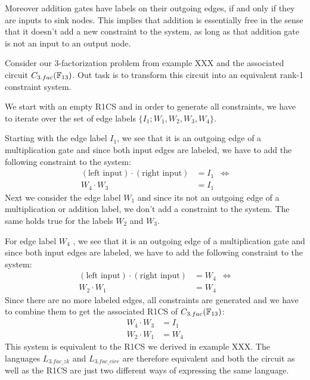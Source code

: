 Moreover addition gates have labels on their outgoing edges, if and only if they are inputs to sink nodes. This implies that addition is essentially free in the sense that it doesn't add a new constraint to the system, as long as that addition gate is not an input to an output node. 
\begin{example}[$3$-factorization] Consider our $3$-factorization problem from example XXX and the associated circuit $C_{3.fac}(\mathbb{F}_{13})$. Out task is to transform this circuit into an equivalent rank-1 constraint system.
\begin{center}
\end{center}
We start with an empty R1CS and in order to generate all constraints, we have to iterate over the set of edge labels $\{I_1;W_1,W_2,W_3,W_4\}$. 

Starting with the edge label $I_1$, we see that it is an outgoing edge of a multiplication gate and since both input edges are labeled, we  have to add the following constraint to the system:
\begin{align*}
(\text{left input})\cdot (\text{right input})  &= I_1 & \Leftrightarrow\\
W_4\cdot W_3  &= I_1
\end{align*}
Next we consider the edge label $W_1$ and since its not an outgoing edge of a multiplication or addition label, we don't add a constraint to the system. The same holds true for the labels $W_2$ and $W_3$. 

For edge label $W_4$ , we see that it is an outgoing edge of a multiplication gate and since both input edges are labeled, we have to add the following constraint to the system:
\begin{align*}
(\text{left input})\cdot (\text{right input})  &= W_4 & \Leftrightarrow\\
W_2\cdot W_1  &= W_4
\end{align*} 
Since there are no more labeled edges, all constraints are generated and we have to combine them to get the associated R1CS of $C_{3.fac}(\mathbb{F}_{13})$: 
\begin{align*}
 W_4\cdot W_3 & = I_1\\
 W_2\cdot W_1 & = W_4
\end{align*}
This system is equivalent to the R1CS we derived in example XXX. The languages $L_{3.fac\_zk}$ and $L_{3.fac\_circ}$ are therefore equivalent and both the circuit as well as the R1CS are just two different ways of expressing the same language.
\end{example}
